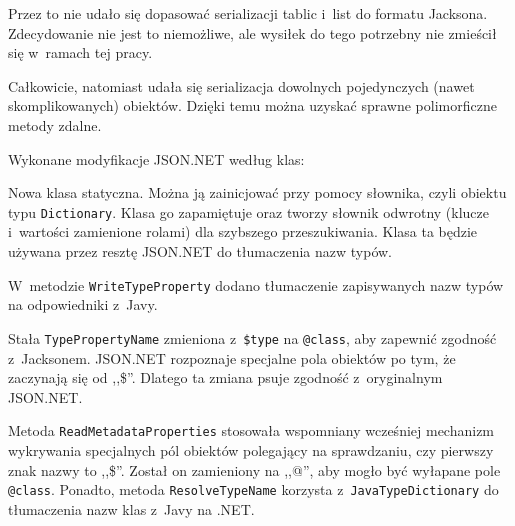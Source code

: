 Przez to nie udało się dopasować serializacji tablic i~list do formatu Jacksona. Zdecydowanie nie jest to niemożliwe, ale wysiłek do tego potrzebny nie zmieścił się w~ramach tej pracy. 

Całkowicie, natomiast udała się serializacja dowolnych pojedynczych (nawet skomplikowanych) obiektów. Dzięki temu można uzyskać sprawne polimorficzne metody zdalne.

Wykonane modyfikacje JSON.NET według klas:
\begin{description}
Nowa klasa statyczna. Można ją zainicjować przy pomocy słownika, czyli obiektu typu \texttt{Dictionary}. Klasa go zapamiętuje oraz tworzy słownik odwrotny (klucze i~wartości zamienione rolami) dla szybszego przeszukiwania. Klasa ta będzie używana przez resztę JSON.NET do tłumaczenia nazw typów.

W~metodzie \texttt{WriteTypeProperty} dodano tłumaczenie zapisywanych nazw typów na odpowiedniki z~Javy.

Stała \texttt{TypePropertyName} zmieniona z~\texttt{\$type} na \texttt{@class}, aby zapewnić zgodność z~Jacksonem. JSON.NET rozpoznaje specjalne pola obiektów po tym, że zaczynają się od ,,\$''. Dlatego ta zmiana psuje zgodność z~oryginalnym JSON.NET.

Metoda \texttt{ReadMetadataProperties} stosowała wspomniany wcześniej mechanizm wykrywania specjalnych pól obiektów polegający na sprawdzaniu, czy  pierwszy znak nazwy to ,,\$''. Został on zamieniony na ,,@'', aby mogło być wyłapane pole \texttt{@class}. Ponadto, metoda \texttt{ResolveTypeName} korzysta z~\texttt{JavaTypeDictionary} do tłumaczenia nazw klas z~Javy na .NET.

\end{description}





